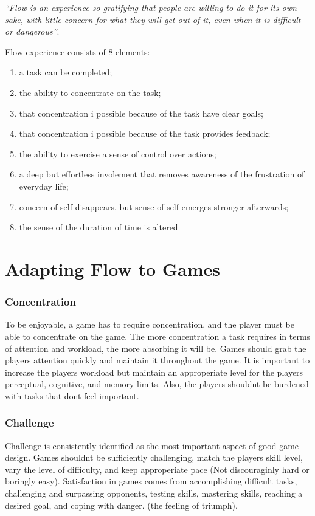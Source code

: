   {\it ``Flow is an experience so gratifying that people are willing to do it for its own sake, with little concern for what they will get out of it, even when it is difficult or dangerous''}. 

  Flow experience consists of 8 elements: 
  \begin{enumerate}
    \item a task can be completed;
    \item the ability to concentrate on the task;
    \item that concentration i possible because of the task have clear goals;
    \item that concentration i possible because of the task provides feedback;
    \item the ability to exercise a sense of control over actions;
    \item a deep but effortless involement that removes awareness of the frustration of everyday life;
    \item concern of self disappears, but sense of self emerges stronger afterwards;
    \item the sense of the duration of time is altered
  \end{enumerate}

  \section*{Adapting Flow to Games}

    \subsubsection*{Concentration}
    To be enjoyable, a game has to require concentration, and the player must be able to concentrate on the game. The more concentration a task requires in terms of attention and workload, the more absorbing it will be. Games should grab the players attention quickly and maintain it throughout the game. It is important to increase the players workload but maintain an approperiate level for the players perceptual, cognitive, and memory limits. Also, the players shouldnt be burdened with tasks that dont feel important. 

    \subsubsection*{Challenge}
    Challenge is consistently identified as the most important aspect of good game design. Games shouldnt be sufficiently challenging, match the players skill level, vary the level of difficulty, and keep approperiate pace (Not discouraginly hard or boringly easy). Satisfaction in games comes from accomplishing difficult tasks, challenging and surpassing opponents, testing skills, mastering skills, reaching a desired goal, and coping with danger.  (the feeling of triumph).

